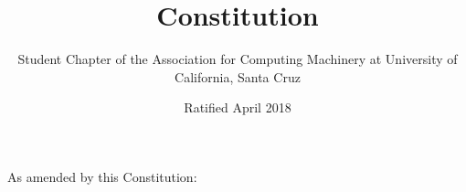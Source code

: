 \documentclass[11pt]{report}
\title{Constitution}
\author{Student Chapter of the Association for Computing Machinery at University of California, Santa Cruz}
\date{Ratified April 2018}
\begin{document}
\maketitle

\noindent
As amended by this Constitution:

\begin{tabular}{l}
	\\
\end{tabular}

\noindent

\newpage

\tableofcontents
\newpage








\end{document}
